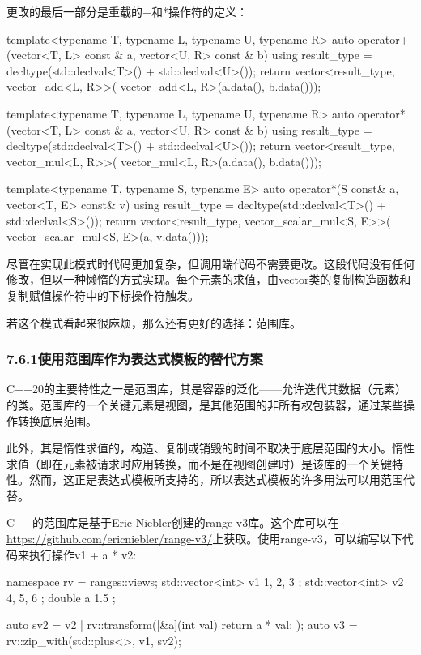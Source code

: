 更改的最后一部分是重载的+和*操作符的定义：

\begin{cpp}
template<typename T, typename L, typename U, typename R>
auto operator+(vector<T, L> const & a,
vector<U, R> const & b)
{
	using result_type = decltype(std::declval<T>() +
								 std::declval<U>());
	return vector<result_type, vector_add<L, R>>(
		vector_add<L, R>(a.data(), b.data()));
}

template<typename T, typename L, typename U, typename R>
auto operator*(vector<T, L> const & a,
vector<U, R> const & b)
{
	using result_type = decltype(std::declval<T>() +
								 std::declval<U>());
	return vector<result_type, vector_mul<L, R>>(
		vector_mul<L, R>(a.data(), b.data()));
}

template<typename T, typename S, typename E>
auto operator*(S const& a, vector<T, E> const& v)
{
	using result_type = decltype(std::declval<T>() +
								 std::declval<S>());
	return vector<result_type, vector_scalar_mul<S, E>>(
		vector_scalar_mul<S, E>(a, v.data()));
}
\end{cpp}

尽管在实现此模式时代码更加复杂，但调用端代码不需要更改。这段代码没有任何修改，但以一种懒惰的方式实现。每个元素的求值，由vector类的复制构造函数和复制赋值操作符中的下标操作符触发。

若这个模式看起来很麻烦，那么还有更好的选择：范围库。

\subsubsection{7.6.1\hspace{0.2cm}使用范围库作为表达式模板的替代方案}

C++20的主要特性之一是范围库，其是容器的泛化——允许迭代其数据（元素）的类。范围库的一个关键元素是视图，是其他范围的非所有权包装器，通过某些操作转换底层范围。

此外，其是惰性求值的，构造、复制或销毁的时间不取决于底层范围的大小。惰性求值（即在元素被请求时应用转换，而不是在视图创建时）是该库的一个关键特性。然而，这正是表达式模板所支持的，所以表达式模板的许多用法可以用范围代替。

C++的范围库是基于Eric Niebler创建的range-v3库。这个库可以在\url{https://github.com/ericniebler/range-v3/}上获取。使用range-v3，可以编写以下代码来执行操作v1 + a * v2:

\begin{cpp}
namespace rv = ranges::views;
std::vector<int> v1{ 1, 2, 3 };
std::vector<int> v2{ 4, 5, 6 };
double a { 1.5 };

auto sv2 = v2 |
		   rv::transform([&a](int val) {return a * val; });
auto v3 = rv::zip_with(std::plus<>{}, v1, sv2);
\end{cpp}

